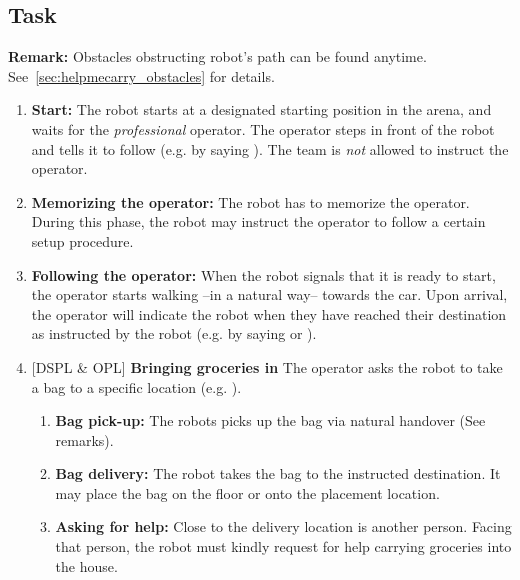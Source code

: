 \subsection{Task}
\textbf{Remark:} Obstacles obstructing robot's path can be found anytime. See~\ref{sec:helpmecarry_obstacles} for details.
\begin{enumerate}
  \item \textbf{Start:} The robot starts at a designated starting position in the arena, and waits for the \textit{professional} operator. The operator steps in front of the robot and tells it to follow (e.g. by saying ). The team is \emph{not} allowed to instruct the operator.

  \item \textbf{Memorizing the operator:} The robot has to memorize the operator. During this phase, the robot may instruct the operator to follow a certain setup procedure.

  \item \textbf{Following the operator:} When the robot signals that it is ready to start, the operator starts walking --in a natural way-- towards the car. Upon arrival, the operator will indicate the robot when they have reached their destination as instructed by the robot (e.g. by saying  or ).

  \setcounter{enumTemp}{\theenumi}
  \item {[DSPL \& OPL]} \textbf{Bringing groceries in}
  The operator asks the robot to take a bag to a specific location (e.g. ).
  \begin{enumerate}
    \item \textbf{Bag pick-up:} The robots picks up the bag via natural handover (See remarks).
    \item \textbf{Bag delivery:} The robot takes the bag to the instructed destination. It may place the bag on the floor or onto the placement location.
    \item \textbf{Asking for help:} Close to the delivery location is another person. Facing that person, the robot must kindly request for help carrying groceries into the house.
  \end{enumerate}


\end{enumerate}
